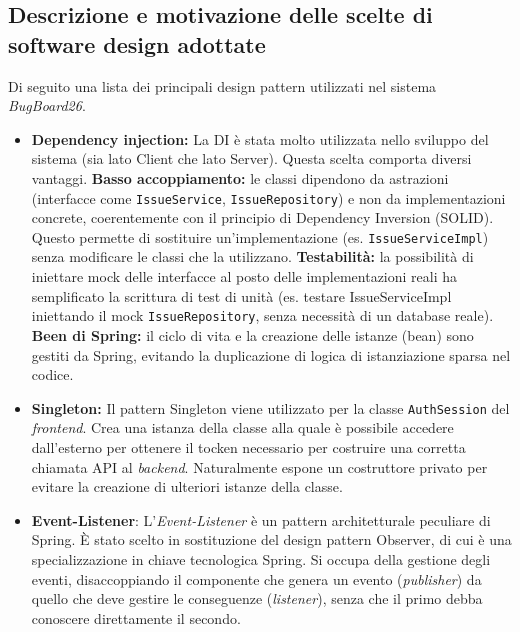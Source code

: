 \documentclass[a4paper,12pt]{article}
\begin{document}
\subsection{Descrizione e motivazione delle scelte di software design adottate} Di seguito una lista dei principali design pattern utilizzati nel sistema \textit{BugBoard26}. 
\begin{itemize}
    \item \textbf{Dependency injection:} La DI è stata molto utilizzata nello sviluppo del sistema (sia lato Client che lato Server). Questa scelta comporta diversi vantaggi. 
    \textbf{Basso accoppiamento:} le classi dipendono da astrazioni (interfacce come \texttt{IssueService}, \texttt{IssueRepository}) e non da implementazioni concrete, coerentemente con il principio di Dependency Inversion (SOLID). Questo permette di sostituire un'implementazione (es. \texttt{IssueServiceImpl}) senza modificare le classi che la utilizzano. 
    \textbf{Testabilità:} la possibilità di iniettare mock delle interfacce al posto delle implementazioni reali ha semplificato la scrittura di test di unità (es. testare IssueServiceImpl iniettando il mock \texttt{IssueRepository}, senza necessità di un database reale). 
    \textbf{Been di Spring:} il ciclo di vita e la creazione delle istanze (bean) sono gestiti da Spring, evitando la duplicazione di logica di istanziazione sparsa nel codice.
    \item \textbf{Singleton:} Il pattern Singleton viene utilizzato per la classe \texttt{AuthSession} del \textit{frontend}. Crea una istanza della classe alla quale è possibile accedere dall'esterno per ottenere il tocken necessario per costruire una corretta chiamata API al \textit{backend}. Naturalmente espone un costruttore privato per evitare la creazione di ulteriori istanze della classe. 
    \item \textbf{Event-Listener}: L'\textit{Event-Listener} è un pattern architetturale peculiare di Spring. È stato scelto in sostituzione del design pattern Observer, di cui è una specializzazione in chiave tecnologica Spring. Si occupa della gestione degli eventi, disaccoppiando il componente che genera un evento (\textit{publisher}) da quello che deve gestire le conseguenze (\textit{listener}), senza che il primo debba conoscere direttamente il secondo.


\end{itemize}
\end{document}
